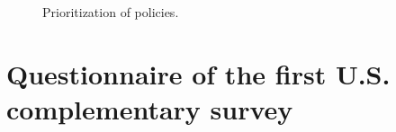 \begin{figure}[h!] %
    \caption{Prioritization of policies.}\label{fig:points_us}
\end{figure}



\clearpage
\section{Questionnaire of the first U.S. complementary survey}

